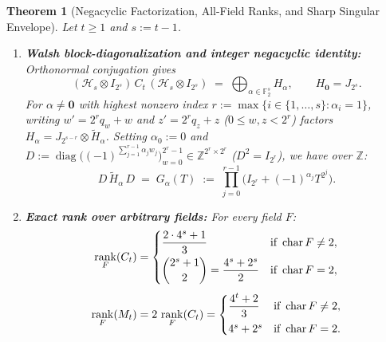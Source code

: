 \documentclass[11pt,reqno]{amsart}
\newtheorem{theorem}{Theorem}[section]
\theoremstyle{definition}
\theoremstyle{remark}
\DeclareMathOperator{\rk}{rank}
\DeclareMathOperator{\diag}{diag}
\newcommand{\FF}{\mathbb{F}}
\newcommand{\ZZ}{\mathbb{Z}}
\newcommand{\zero}{\mathbf{0}}
\numberwithin{equation}{section}
\begin{document}
\begin{theorem}[Negacyclic Factorization, All-Field Ranks, and Sharp Singular Envelope]
  \label{thm:walsh-spectrum}
  Let $t \ge 1$ and $s := t - 1$.
  \begin{enumerate}[leftmargin=2em,label=\textup{(\alph*)}]
    \item \textbf{Walsh block-diagonalization and integer negacyclic identity:} Orthonormal conjugation gives
    \begin{equation}
      \label{eq:walsh-blocks}
      (\mathcal{H}_s \otimes I_{2^s})\,C_t\,(\mathcal{H}_s \otimes I_{2^s}) \;=\; \bigoplus_{\alpha \in \FF_2^s} H_\alpha, \qquad H_{\zero} = J_{2^s}.
    \end{equation}
    For $\alpha \neq \zero$ with highest nonzero index $r := \max\{i \in \{1, \dots, s\} : \alpha_i = 1\}$, writing $w' = 2^r q_w + w$ and $z' = 2^r q_z + z$ ($0 \le w, z < 2^r$) factors $H_\alpha = J_{2^{s-r}} \otimes \widetilde{H}_\alpha$. Setting $\alpha_0 := 0$ and $D := \diag\bigl((-1)^{\sum_{j=1}^{r-1} \alpha_j w_j}\bigr)_{w=0}^{2^r-1} \in \ZZ^{2^r \times 2^r}$ ($D^2 = I_{2^r}$), we have over $\ZZ$:
    \begin{equation}
      \label{eq:negacyclic-prod}
      D\,\widetilde{H}_\alpha\,D \;=\; G_\alpha(T) \;:=\; \prod_{j=0}^{r-1}\bigl(I_{2^r} + (-1)^{\alpha_j} T^{2^j}\bigr).
    \end{equation}

    \item \textbf{Exact rank over arbitrary fields:} For every field $F$:
    \begin{equation}
      \label{eq:all-field-ranks}
      \begin{aligned}
        \rk_F(C_t) &= \begin{cases}
          \dfrac{2 \cdot 4^s + 1}{3} & \text{if } \operatorname{char} F \neq 2, \\[6pt]
          \dbinom{2^s + 1}{2} = \dfrac{4^s + 2^s}{2} & \text{if } \operatorname{char} F = 2,
        \end{cases} \\[4pt]
        \rk_F(M_t) &= 2\,\rk_F(C_t) = \begin{cases}
          \dfrac{4^t + 2}{3} & \text{if } \operatorname{char} F \neq 2, \\[6pt]
          4^s + 2^s & \text{if } \operatorname{char} F = 2.
        \end{cases}
      \end{aligned}
    \end{equation}


\end{enumerate}
\end{theorem}
\end{document}
